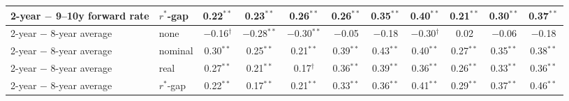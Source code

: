 \begin{tabular}{llccccccccc}
2-year $-$ 9--10y forward rate & $r^*$-gap & 0.22$^{**}$ & 0.23$^{**}$ & 0.26$^{**}$ & 0.26$^{**}$ & 0.35$^{**}$ & 0.40$^{**}$ & 0.21$^{**}$ & 0.30$^{**}$ & 0.37$^{**}$ \\
\midrule
2-year $-$ 8-year average & none & $-$0.16$^{\dagger}$ & $-$0.28$^{**}$ & $-$0.30$^{**}$ & $-$0.05 & $-$0.18 & $-$0.30$^{\dagger}$ & 0.02 & $-$0.06 & $-$0.18 \\
2-year $-$ 8-year average & nominal & 0.30$^{**}$ & 0.25$^{**}$ & 0.21$^{**}$ & 0.39$^{**}$ & 0.43$^{**}$ & 0.40$^{**}$ & 0.27$^{**}$ & 0.35$^{**}$ & 0.38$^{**}$ \\
2-year $-$ 8-year average & real & 0.27$^{**}$ & 0.21$^{**}$ & 0.17$^{\dagger}$ & 0.36$^{**}$ & 0.39$^{**}$ & 0.36$^{**}$ & 0.26$^{**}$ & 0.33$^{**}$ & 0.36$^{**}$ \\
2-year $-$ 8-year average & $r^*$-gap & 0.22$^{**}$ & 0.17$^{**}$ & 0.21$^{**}$ & 0.33$^{**}$ & 0.36$^{**}$ & 0.41$^{**}$ & 0.29$^{**}$ & 0.37$^{**}$ & 0.46$^{**}$ \\
\bottomrule
\end{tabular}
